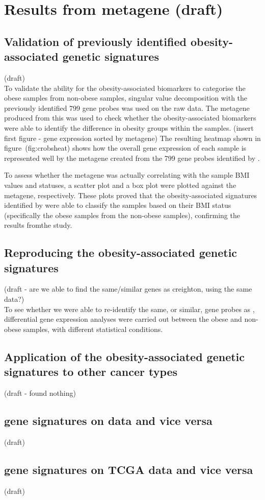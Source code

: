 \chapter{Results from \citet{Creighton2012} metagene (draft)}

\section{Validation of previously identified obesity-associated genetic signatures}

(draft)\\
To validate the ability for the obesity-associated biomarkers to categorise the obese samples from non-obese samples, singular value decomposition with the previously identified 799 gene probes was used on the raw data.
The metagene produced from this was used to check whether the obesity-associated biomarkers were able to identify the difference in obesity groups within the samples.
(insert first figure - gene expression sorted by metagene)
The resulting heatmap shown in figure~(fig:crobsheat) shows how the overall gene expression of each sample is represented well by the metagene created from the 799 gene probes identified by \citet{Creighton2012}.

To assess whether the metagene was actually correlating with the sample BMI values and statuses, a scatter plot and a box plot were plotted against the metagene, respectively.
These plots proved that the obesity-associated signatures identified by \citet{Creighton2012} were able to classify the samples based on their BMI status (specifically the obese samples from the non-obese samples), confirming the results fromthe study.

\section{Reproducing the obesity-associated genetic signatures}

(draft - are we able to find the same/similar genes as creighton, using the same data?)\\
To see whether we were able to re-identify the same, or similar, gene probes as \citet{Creighton2012}, differential gene expression analyses were carried out between the obese and non-obese samples, with different statistical conditions.

\section{Application of the obesity-associated genetic signatures to other cancer types}

(draft - found nothing)

\section{\citet{Fuentes-Mattei2014} gene signatures on \citet{Creighton2012} data and vice versa}

(draft)

\section{\citet{Fuentes-Mattei2014} gene signatures on TCGA data and vice versa}

(draft)

